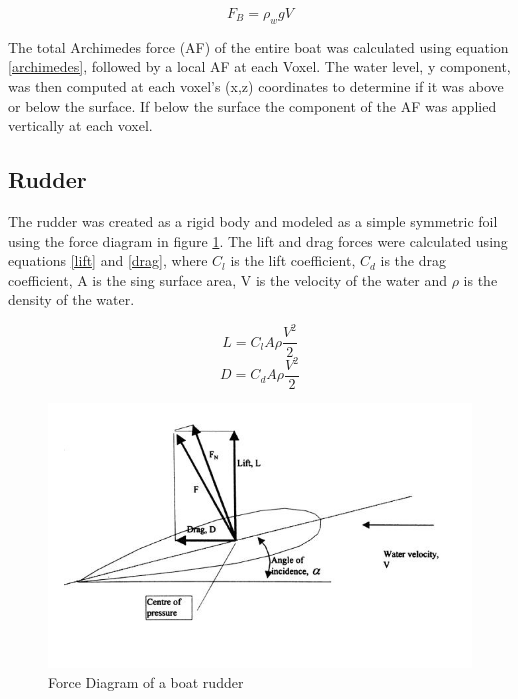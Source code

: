 \begin{equation}
    F_B = \rho_{w}gV
    \label{archimedes}
\end{equation}

The total Archimedes force (AF) of the entire boat was calculated using equation \ref{archimedes}, followed by a local AF at each Voxel. The water level, y component, was then computed at each voxel's (x,z) coordinates to determine if it was above or below the surface. If below the surface the component of the AF was applied vertically at each voxel. 

\subsection{Rudder}
The rudder was created as a rigid body and modeled as a simple symmetric foil using the force diagram in figure \ref{rudderForce}. The lift and drag forces were calculated using equations \ref{lift} and \ref{drag}, where ${C_l}$ is the lift coefficient, ${C_d}$ is the drag coefficient, A is the sing surface area, V is the velocity of the water and ${\rho}$ is the density of the water.



\begin{equation}
    L = {C_l}A\rho\frac{V^2}{2}
    \label{lift}
\end{equation}
\begin{equation}
    D = {C_d}A\rho\frac{V^2}{2}
    \label{drag}
\end{equation}
 
\begin{figure}
    \centering
    \includegraphics{chapters/chapter04/rudder.JPG}
    \caption{Force Diagram of a boat rudder}
    \label{rudderForce}
\end{figure}

